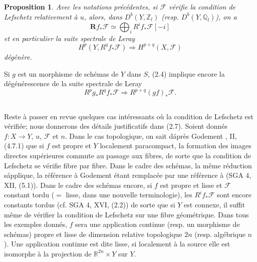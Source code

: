 \documentclass[12pt]{amsart}
\theoremstyle{plain}
\newtheorem{prop}{Proposition}[section]
\theoremstyle{remark}
\newcommand{\cF}{\mathscr{F}}
\newcommand{\Rf}{\mathbf{R}f_*}
\newcommand{\db}{D^b}
\begin{document}
\begin{prop}\label{prop:2.4}
Avec les notations pr\'ec\'edentes, si $\cF$ v\'erifie la condition de Lefschetz relativement \`a $u$, alors, dans $\db(Y, \mathbb{Z}_l)$ (resp. $\db(Y, \mathbb{Q}_l)$), on a
\begin{equation}\label{eq:2.5}
\Rf\cF \simeq \bigoplus_i R^if_*\cF[-i]
\end{equation}
et en particulier la suite spectrale de Leray
\[
H^p(Y, R^qf_*\cF) \Rightarrow H^{p+q}(X, \cF)
\]
d\'eg\'en\`ere.
\end{prop}

Si $g$ est un morphisme de sch\'emas de $Y$ dans $S$, (2.4) implique encore la d\'eg\'en\'erescence de la suite spectrale de Leray
\[
R^pg_*R^qf_*\cF \Rightarrow R^{p+q}(gf)_*\cF.
\]

\subsection{}
Reste \`a passer en revue quelques cas int\'eressants o\`u la condition de Lefschetz est v\'erifi\'ee; nous donnerons des d\'etails justificatifs dans (2.7). Soient donn\'es $f: X \to Y$, $u$, $\cF$ et $n$. Dans le cas topologique, on sait d\'apr\`es Godement \cite{Godement}, II, (4.7.1) que si $f$ est propre et $Y$ localement paracompact, la formation des images directes sup\'erieures commute au passage aux fibres, de sorte que la condition de Lefschetz se v\'erifie fibre par fibre. Dans le cadre des sch\'emas, la m\^eme r\'eduction s\'applique, la r\'ef\'erence \`a Godement \'etant remplac\'ee par une r\'ef\'erence \`a (SGA 4, XII, (5.1)). Dans le cadre des sch\'emas encore, si $f$ est propre et lisse et $\cF$ constant tordu ($=$ lisse, dans une nouvelle terminologie), les $R^if_*\cF$ sont encore constants tordus (cf. SGA 4, XVI, (2.2)) de sorte que si $Y$ est connexe, il suffit m\^eme de v\'erifier la condition de Lefschetz sur une fibre g\'eom\'etrique. Dans tous les exemples donn\'es, $f$ sera une application continue (resp. un morphisme de sch\'emas) propre et lisse de dimension relative topologique $2n$ (resp. alg\'ebrique $n$). Une application continue est dite lisse, si localement \`a la source elle est isomorphe \`a la projection de $\mathbb{R}^{2n} \times Y$ sur $Y$.
\end{document}
